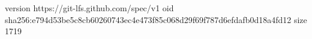 version https://git-lfs.github.com/spec/v1
oid sha256:e794d53be5c8cb60260743ec4e473f85c068d29f69f787d6efdafb0d18a4fd12
size 1719
